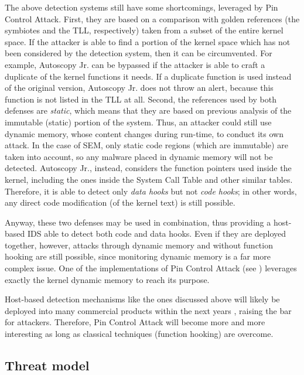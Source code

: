 The above detection systems still have some shortcomings, leveraged by Pin Control Attack.
First, they are based on a comparison with golden references (the symbiotes and the TLL, respectively) taken from a subset of the entire kernel space.
If the attacker is able to find a portion of the kernel space which has not been considered by the detection system, then it can be circumvented.
For example, Autoscopy Jr. can be bypassed if the attacker is able to craft a duplicate of the kernel functions it needs.
If a duplicate function is used instead of the original version, Autoscopy Jr. does not throw an alert, because this function is not listed in the TLL at all.
Second, the references used by both defenses are \emph{static}, which means that they are based on previous analysis of the immutable (static) portion of the system.
Thus, an attacker could still use dynamic memory, whose content changes during run-time, to conduct its own attack.
In the case of SEM, only static code regions (which are immutable) are taken into account, so any malware placed in dynamic memory will not be detected.
Autoscopy Jr., instead, considers the function pointers used inside the kernel, including the ones inside the System Call Table and other similar tables.
Therefore, it is able to detect only \emph{data hooks} but not \emph{code hooks}; in other words, any direct code modification (\eg of the kernel text) is still possible.

Anyway, these two defenses may be used in combination, thus providing a host-based IDS able to detect both code and data hooks.
Even if they are deployed together, however, attacks through dynamic memory and without function hooking are still possible,
since monitoring dynamic memory is a far more complex issue. One of the implementations of Pin Control Attack (see )
leverages exactly the kernel dynamic memory to reach its purpose.

Host-based detection mechanisms like the ones discussed above will likely be deployed into many commercial products within the next years \cite{symbiote_web, autoscopy_web},
raising the bar for attackers. Therefore, Pin Control Attack will become more and more interesting as long as classical techniques (\eg function hooking) are overcome.


\subsection{Threat model}
\label{sec:threat_model}

